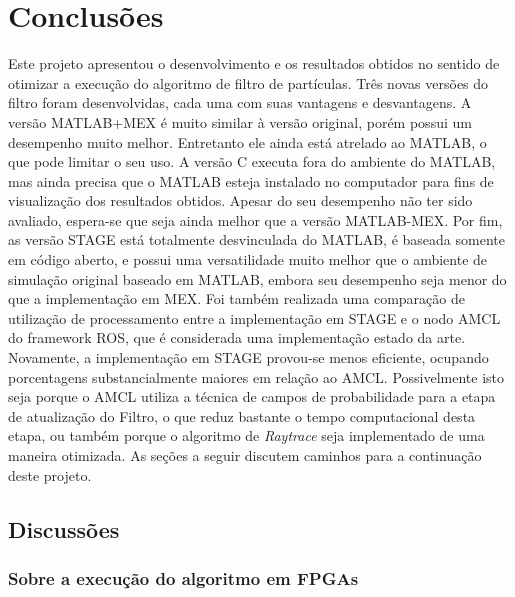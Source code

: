 \documentclass[
	12pt,				%
	openright,			%
	oneside,			%
	a4paper,			%
	english,			%
	french,				%
	spanish,			%
	brazil,				%
	]{abntex2}
\begin{document}
\chapter[Conclusões]{Conclusões}

Este projeto apresentou o desenvolvimento e os resultados obtidos no sentido de otimizar a execução do algoritmo de filtro de partículas. Três novas versões do filtro foram desenvolvidas, cada uma com suas vantagens e desvantagens. A versão MATLAB+MEX é muito similar à versão original, porém possui um desempenho muito melhor. Entretanto ele ainda está atrelado ao MATLAB, o que pode limitar o seu uso. A versão C executa fora do ambiente do MATLAB, mas ainda precisa que o MATLAB esteja instalado no computador para fins de visualização dos resultados obtidos. Apesar do seu desempenho não ter sido avaliado, espera-se que seja ainda melhor que a versão MATLAB-MEX. Por fim, as versão STAGE está totalmente desvinculada do MATLAB, é baseada somente em código aberto, e possui uma versatilidade muito melhor que o ambiente de simulação original baseado em MATLAB, embora seu desempenho seja menor do que a implementação em MEX. Foi também realizada uma comparação de utilização de processamento entre a implementação em STAGE e o nodo AMCL do framework ROS, que é considerada uma implementação estado da arte. Novamente, a implementação em STAGE provou-se menos eficiente, ocupando porcentagens substancialmente maiores em relação ao AMCL. Possivelmente isto seja porque o AMCL utiliza a técnica de campos de probabilidade para a etapa de atualização do Filtro, o que reduz bastante o tempo computacional desta etapa, ou também porque o algoritmo de \emph{Raytrace} seja implementado de uma maneira otimizada. As seções a seguir discutem caminhos para a continuação deste projeto.

\section{Discussões}

\subsection{Sobre a execução do algoritmo em FPGAs}
\end{document}
